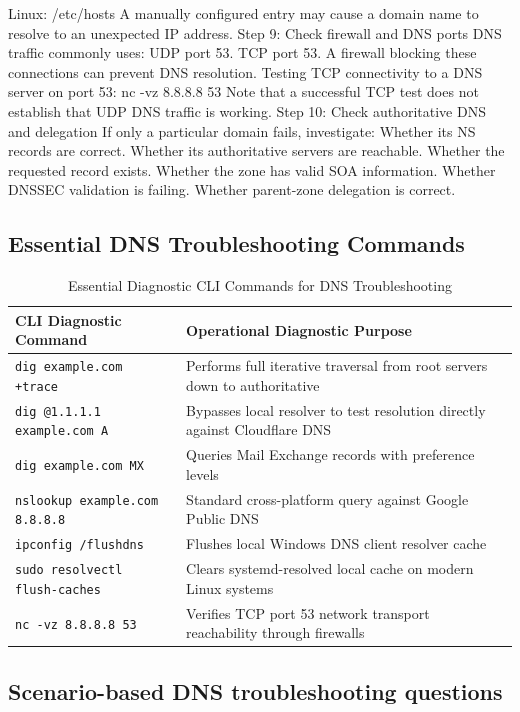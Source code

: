 Linux:
/etc/hosts
A manually configured entry may cause a domain name to resolve to an unexpected IP address.
Step 9: Check firewall and DNS ports
DNS traffic commonly uses:
UDP port 53.
TCP port 53.
A firewall blocking these connections can prevent DNS resolution.
Testing TCP connectivity to a DNS server on port 53:
nc -vz 8.8.8.8 53
Note that a successful TCP test does not establish that UDP DNS traffic is working.
Step 10: Check authoritative DNS and delegation
If only a particular domain fails, investigate:
Whether its NS records are correct.
Whether its authoritative servers are reachable.
Whether the requested record exists.
Whether the zone has valid SOA information.
Whether DNSSEC validation is failing.
Whether parent-zone delegation is correct.
\subsection{Essential DNS Troubleshooting Commands}
\begin{table}[htbp]
\centering
\caption{Essential Diagnostic CLI Commands for DNS Troubleshooting}
\label{tab:dns_cli_commands}
\begin{tabularx}{\textwidth}{p{4.5cm} X}
\toprule
\textbf{CLI Diagnostic Command} & \textbf{Operational Diagnostic Purpose} \\
\midrule
\texttt{dig example.com +trace} & Performs full iterative traversal from root servers down to authoritative \\
\texttt{dig @1.1.1.1 example.com A} & Bypasses local resolver to test resolution directly against Cloudflare DNS \\
\texttt{dig example.com MX} & Queries Mail Exchange records with preference levels \\
\texttt{nslookup example.com 8.8.8.8} & Standard cross-platform query against Google Public DNS \\
\texttt{ipconfig /flushdns} & Flushes local Windows DNS client resolver cache \\
\texttt{sudo resolvectl flush-caches} & Clears systemd-resolved local cache on modern Linux systems \\
\texttt{nc -vz 8.8.8.8 53} & Verifies TCP port 53 network transport reachability through firewalls \\
\bottomrule
\end{tabularx}
\end{table}
\subsection{Scenario-based DNS troubleshooting questions}
